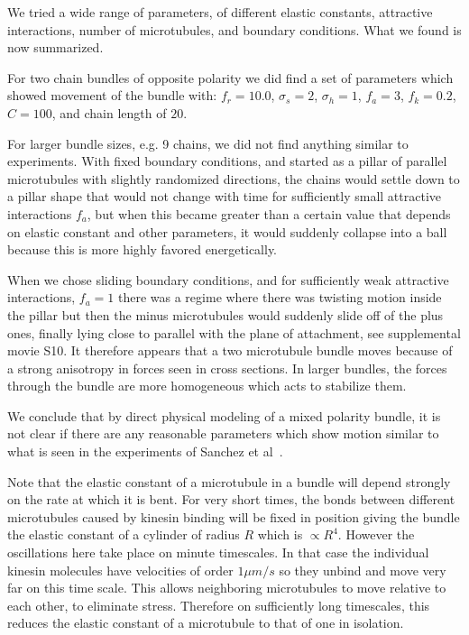\documentclass[11pt]{ucthesis}
\begin{document}
We tried a wide range of parameters, of different elastic constants, attractive
interactions, number of microtubules, and boundary conditions. What we found is
now summarized. 

For two chain bundles of opposite polarity we did find a set of parameters which
showed movement of the bundle with: 
$f_r =  10.0$, $\sigma_s =  2$, $\sigma_h = 1$, $f_a =  3$, $f_k = 0.2$, $C=
100$, and chain length of $20$.

For larger bundle sizes, e.g. 9 chains,  we did not find anything similar to
experiments. With fixed boundary conditions, and started as a pillar of
parallel microtubules with slightly randomized directions, the chains would settle down to
a pillar shape that would not change with time for sufficiently small attractive
interactions $f_a$, but when this became greater than a certain value that
depends on elastic constant and other parameters, it would suddenly collapse
into a ball because this is more highly favored energetically.

When we chose sliding boundary conditions, and for sufficiently weak attractive
interactions, $f_a=1$ there was a regime where there was twisting motion inside the
pillar but then the minus microtubules would suddenly slide off of the plus
ones, finally lying close to parallel with the plane of attachment, see supplemental movie S10. 
It therefore appears that a two microtubule bundle moves because of a strong
anisotropy in forces seen in cross sections. In larger bundles, the forces
through the bundle are more homogeneous which acts to stabilize them.

We conclude that by direct physical modeling of a mixed polarity bundle, it is
not clear if there are any reasonable parameters which show motion similar to
what is seen in the experiments of Sanchez et al~\cite{Sanchez2011,sanchez2013engineering}.

Note that the elastic constant of a microtubule in a bundle will depend strongly on the
rate at which it is bent. For very short times, the bonds between different
microtubules caused by kinesin binding will be fixed in position giving the bundle the
elastic constant of a cylinder of radius $R$ which is $\propto R^4$. However the
oscillations here take place on minute timescales. In that case the individual
kinesin molecules have velocities of order $1\mu m/s$ so 
they unbind and move very far
on this time scale. This allows neighboring microtubules to move relative to
each other, to eliminate stress. Therefore on sufficiently long timescales,
this reduces the elastic constant of a microtubule to that of one in isolation.
\end{document}
